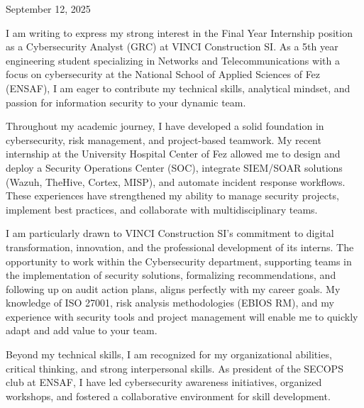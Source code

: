 \documentclass[11pt, a4paper]{awesome-cv}
\begin{document}
\makecvheader[R]

\makecvfooter
{September 12, 2025}
{}
{}

\makelettertitle

\begin{cvletter}


    I am writing to express my strong interest in the Final Year Internship position as a Cybersecurity Analyst (GRC) at VINCI Construction SI. As a 5th year engineering student specializing in Networks and Telecommunications with a focus on cybersecurity at the National School of Applied Sciences of Fez (ENSAF), I am eager to contribute my technical skills, analytical mindset, and passion for information security to your dynamic team.

    Throughout my academic journey, I have developed a solid foundation in cybersecurity, risk management, and project-based teamwork. My recent internship at the University Hospital Center of Fez allowed me to design and deploy a Security Operations Center (SOC), integrate SIEM/SOAR solutions (Wazuh, TheHive, Cortex, MISP), and automate incident response workflows. These experiences have strengthened my ability to manage security projects, implement best practices, and collaborate with multidisciplinary teams.

    I am particularly drawn to VINCI Construction SI’s commitment to digital transformation, innovation, and the professional development of its interns. The opportunity to work within the Cybersecurity department, supporting teams in the implementation of security solutions, formalizing recommendations, and following up on audit action plans, aligns perfectly with my career goals. My knowledge of ISO 27001, risk analysis methodologies (EBIOS RM), and my experience with security tools and project management will enable me to quickly adapt and add value to your team.

    Beyond my technical skills, I am recognized for my organizational abilities, critical thinking, and strong interpersonal skills. As president of the SECOPS club at ENSAF, I have led cybersecurity awareness initiatives, organized workshops, and fostered a collaborative environment for skill development.


\end{cvletter}
\end{document}
